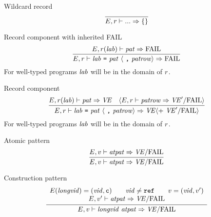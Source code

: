 
\begin{inference-rule}{Wildcard record}
\begin{equation}\label{rule:dynamic-core:wildcard-record}
\vcenter{\infer{\E,\r\ts\wildrec\ra\emptymap}
  {}}
\end{equation}
\end{inference-rule}

\begin{inference-rule}{Record component with inherited FAIL}
\begin{equation}\label{rule:dynamic-core:longlab-dyn-rule1}
\vcenter{\infer{\E,\r\ts\longlabpats\ra\FAIL}
  {\E,\r(\lab)\ts\pat\ra\FAIL}}
\end{equation}
For well-typed programs $\textit{lab\/}$ will be in the domain of $r$.
\end{inference-rule}

\begin{inference-rule}{Record component}
\begin{equation}\label{rule:dynamic-core:record-component}
\vcenter{\infer{\E,\r\ts\longlabpats\ra
    \VE\optional{ +\ \VE'/\fail}}
  {\E,\r(\lab)\ts\pat\ra\VE
    & \optional{\E,\r\ts\labpats\ra\VE'/\fail} }}
\end{equation}
For well-typed programs $\textit{lab\/}$ will be in the domain of $r$.
\end{inference-rule}


\begin{inference-rule}{Atomic pattern}
\begin{equation}\label{rule:dynamic-core:atomic-pattern}
\vcenter{\infer{\E,\V\ts\atpat\ra \VE/\fail}
  {\E,\V\ts\atpat\ra \VE/\fail}}
\end{equation}
\end{inference-rule}

\begin{inference-rule}{Construction pattern}
\begin{equation}\label{rule:dynamic-core:conpat-rule1}
\vcenter{\infer{\E,\V\ts\vidpat\ra \VE/\fail}
  {\begin{array}{c}
      \E(\longvid) = (\vid,\isc)\qquad\vid\neq\REF\qquad
      \V=(\vid,\V')\\
      \E,\V'\ts\atpat\ra\VE/\fail
\end{array}}}
\end{equation}
\end{inference-rule}

